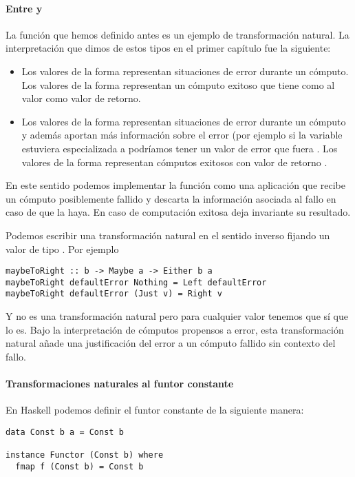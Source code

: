 \paragraph{Entre  y }
La función  que hemos definido
antes es un ejemplo de transformación natural. La interpretación
que dimos de estos tipos en el primer capítulo fue la siguiente:
\begin{itemize}
\item Los valores de la forma  representan
  situaciones de error durante un cómputo. Los valores de la forma
   representan un cómputo exitoso que tiene
  como al valor  como valor de retorno.
\item Los valores de la forma  representan
  situaciones de error durante un cómputo y además aportan más información
  sobre el error (por ejemplo si la variable  estuviera
  especializada a  podríamos tener un valor de error
  que fuera . Los
  valores de la forma  representan cómputos
  exitosos con valor de retorno .
\end{itemize}

En este sentido podemos implementar la función  como
una aplicación que recibe un cómputo posiblemente fallido y descarta
la información asociada al fallo en caso de que la haya. En caso de
computación exitosa deja invariante su resultado.

Podemos escribir una transformación natural en el sentido inverso
fijando un valor de tipo . Por ejemplo

\begin{verbatim}
maybeToRight :: b -> Maybe a -> Either b a
maybeToRight defaultError Nothing = Left defaultError
maybeToRight defaultError (Just v) = Right v
\end{verbatim}

Y  no es una transformación natural pero para
cualquier valor  tenemos que
 sí que lo es. Bajo
la interpretación de cómputos propensos a error, esta transformación
natural añade una justificación del error a un cómputo fallido
sin contexto del fallo.

\paragraph{Transformaciones naturales al funtor constante}
En Haskell podemos definir el funtor constante de la siguiente
manera:
\begin{verbatim}
data Const b a = Const b

instance Functor (Const b) where
  fmap f (Const b) = Const b
\end{verbatim}

